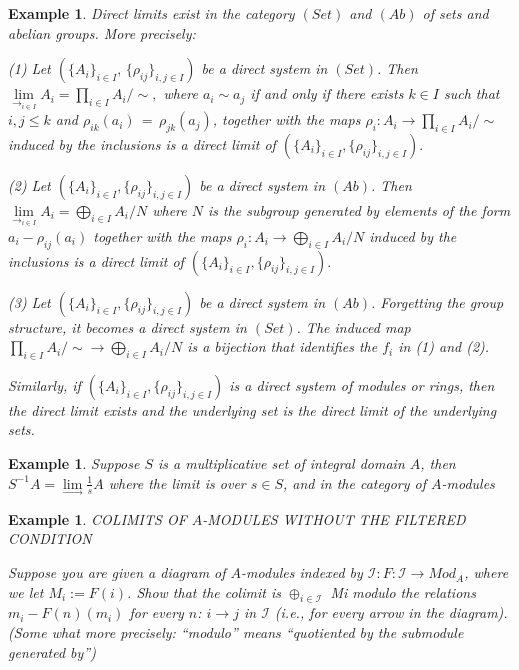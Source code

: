 \documentclass{article}
\newtheorem{example}[theorem]{Example}
\begin{document}
\begin{example}
Direct limits exist in the category $(Set)$ and $(Ab)$ of sets and abelian groups. More precisely:

(1) Let $\left(\{A_{i}\}_{i\in I},\,\{\rho_{i j}\}_{i,j\in I}\right)$ be a direct system in $(Set)$. Then 
$\lim\limits_\rightarrow _{i\in I}A_{i} = \prod_{i\in I}A_{i}/\sim,$ 
where $a_{i}\sim a_{j}$ 
if and only if there exists $k\in I$ such that ${i,j}\leq k$ and $\rho_{i k}(a_{i})\,=\,\rho_{j k}(a_{j})$, 
together with the maps $\rho_{i}:A_{i} \rightarrow \prod_{i\in I}A_{i}/\sim$
induced by the inclusions is a direct limit of $(\{A_{i}\}_{i\in I},\{\rho_{i j}\}_{i,j\in I}).$ 

(2) Let $(\{A_{i}\}_{i\in I},\{\rho_{i j}\}_{i,j\in I})$ be a direct system in $(Ab)$. Then $\lim\limits_\rightarrow _{i\in I}A_{i}=\bigoplus_{i\in I}A_{i}/N$  
where
$N$ is the subgroup generated by elements of the form $a_{i}-\rho_{i j}(a_{i})$  together with the maps $\rho_{i}:A_{i} \rightarrow\bigoplus_{i\in I}A_{i}/N$ induced by the inclusions is a direct limit of $(\{A_{i}\}_{i\in I},\{\rho_{i j}\}_{i,j\in I}).$  

(3) Let $(\{A_{i}\}_{i\in I},\{\rho_{i j}\}_{i,j\in I})$ be a direct system in $(Ab)$. Forgetting the group structure, it becomes a direct system in $(Set)$. The induced map $\textstyle{\prod_{i\in I}A_{i}/\sim\to\bigoplus_{i\in I}A_{i}/N}$ 
is a bijection
that identifies the $f_i$
in (1) and (2).

Similarly, if $(\{A_{i}\}_{i\in I},\{\rho_{i j}\}_{i,j\in I})$ is a direct system of modules or rings, then the direct limit exists and the underlying set is the direct limit of the underlying sets.
\end{example}
\begin{example}
     Suppose $S$ is a multiplicative set of integral domain $A$, then $S^{-1}A =\lim\limits_\rightarrow\frac{1}{s}A$ where the limit is over $s \in S$, and in the category of $A$-modules
\end{example}
\begin{example}
    COLIMITS OF $A$-MODULES WITHOUT THE FILTERED CONDITION

    Suppose you are given a diagram of $A$-modules indexed by $\mathscr I : F: \mathscr I \rightarrow Mod_A$, where we let $M_i := F(i)$. Show that the colimit is $\oplus_{i\in\mathscr I}$ Mi modulo the relations $m_i-F(n)(m_i)$ for every $n$: $i \rightarrow j$ in $\mathscr I$ (i.e., for every arrow in the diagram). (Some what more precisely: “modulo” means “quotiented by the submodule generated by”)
\end{example}
\end{document}
